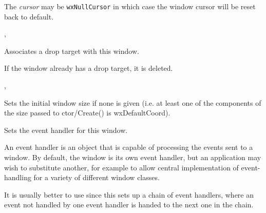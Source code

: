 The {\it cursor} may be {\tt wxNullCursor} in which case the window cursor will
be reset back to default.




, 


\label{wxwindowsetdroptarget}


Associates a drop target with this window.

If the window already has a drop target, it is deleted.


,



\label{wxwindowsetinitialbestsize}


Sets the initial window size if none is given (i.e. at least one of the
components of the size passed to ctor/Create() is wxDefaultCoord).

\label{wxwindowseteventhandler}


Sets the event handler for this window.




An event handler is an object that is capable of processing the events
sent to a window. By default, the window is its own event handler, but
an application may wish to substitute another, for example to allow
central implementation of event-handling for a variety of different
window classes.

It is usually better to use  since
this sets up a chain of event handlers, where an event not handled by one event handler is
handed to the next one in the chain.

